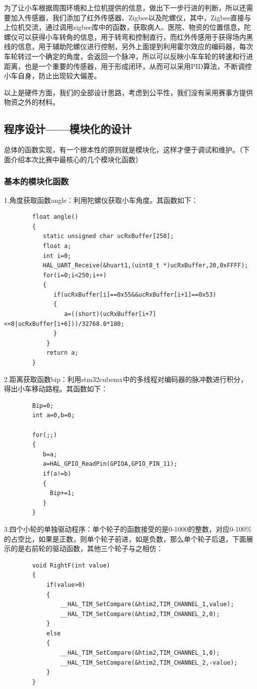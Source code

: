 \documentclass[UTF8]{ctexart}
\begin{document}
为了让小车根据周围环境和上位机提供的信息，做出下一步行进的判断，所以还需要加入传感器，我们添加了红外传感器、Zigbee以及陀螺仪，其中，Zigbee直接与上位机交流，通过调用zigbee库中的函数，获取病人、医院、物资的位置信息，陀螺仪可以获得小车转角的信息，用于转弯和控制直行，而红外传感用于获得场内黑线的信息，用于辅助陀螺仪进行控制，另外上面提到利用霍尔效应的编码器，每次车轮转过一个确定的角度，会返回一个脉冲，所以可以反映小车车轮的转速和行进距离，也是一个重要的传感器，用于形成闭环，从而可以采用PID算法，不断调控小车自身，防止出现较大偏差。

以上是硬件方面，我们的全部设计思路，考虑到公平性，我们没有采用赛事方提供物资之外的材料。

\subsection{程序设计——模块化的设计}
总体的函数实现，有一个根本性的原则就是模块化，这样才便于调试和维护。（下面介绍本次比赛中最核心的几个模块化函数）
\subsubsection{基本的模块化函数}

    1.角度获取函数angle：利用陀螺仪获取小车角度。其函数如下：
    \begin{lstlisting}
        float angle()
        {
           static unsigned char ucRxBuffer[250];
           float a;
           int i=0;
           HAL_UART_Receive(&huart1,(uint8_t *)ucRxBuffer,20,0xFFFF);
           for(i=0;i<250;i++)
           {
              if(ucRxBuffer[i]==0x55&&ucRxBuffer[i+1]==0x53)
              {	
                 a=((short)(ucRxBuffer[i+7]<<8|ucRxBuffer[i+6]))/32768.0*180;
              }
            }
            return a;
        }
        \end{lstlisting}
   
        2.距离获取函数bip：利用stm32cubemx中的多线程对编码器的脉冲数进行积分，得出小车移动路程。其函数如下：
    \begin{lstlisting}
        Bip=0;
        int a=0,b=0;
        
        for(;;)
        {
           b=a;
           a=HAL_GPIO_ReadPin(GPIOA,GPIO_PIN_11);
           if(a!=b)
           {
             Bip+=1;
           }		
        }
        \end{lstlisting}
    
        3.四个小轮的单独驱动程序：单个轮子的函数接受的是0-1000的整数，对应0-100$\%$的占空比，如果是正数，则单个轮子前进，如是负数，那么单个轮子后退，下面展示的是右前轮的驱动函数，其他三个轮子与之相仿：
    \begin{lstlisting}
        void RightF(int value)
        {
            if(value>0)
            {
                __HAL_TIM_SetCompare(&htim2,TIM_CHANNEL_1,value);
                __HAL_TIM_SetCompare(&htim2,TIM_CHANNEL_2,0);
            }
            else
            {
                __HAL_TIM_SetCompare(&htim2,TIM_CHANNEL_1,0);
                __HAL_TIM_SetCompare(&htim2,TIM_CHANNEL_2,-value);
            }
        }
        \end{lstlisting}
\end{document}
